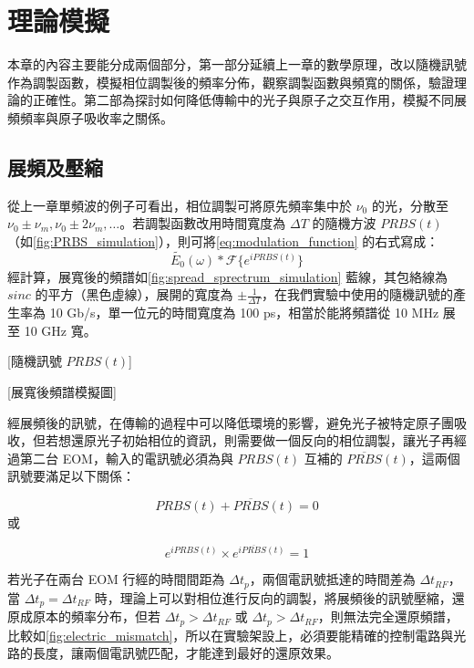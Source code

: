\documentclass[class=NCU_thesis, crop=false]{standalone}
\begin{document}
\chapter{理論模擬}
本章的內容主要能分成兩個部分，第一部分延續上一章的數學原理，改以隨機訊號作為調製函數，模擬相位調製後的頻率分佈，觀察調製函數與頻寬的關係，驗證理論的正確性。第二部為探討如何降低傳輸中的光子與原子之交互作用，模擬不同展頻頻率與原子吸收率之關係。

\section{展頻及壓縮}
從上一章單頻波的例子可看出，相位調製可將原先頻率集中於 $\nu_{0}$ 的光，分散至 $\nu_{0}\pm\nu_{m}, \nu_{0}\pm2\nu_{m},\dots$。若調製函數改用時間寬度為 $\Delta T$ 的隨機方波 $PRBS(t)$ （如\cref{fig:PRBS_simulation}），則可將\cref{eq:modulation_function} 的右式寫成：
\begin{equation}
    \tilde{E_{0}}(\omega)*\mathscr{F}\{{e^{i PRBS(t)}}\}
\end{equation}
經計算，展寬後的頻譜如\cref{fig:spread_sprectrum_simulation} 藍線，其包絡線為 $sinc$ 的平方（黑色虛線），展開的寬度為 $\pm\frac{1}{\Delta T}$，在我們實驗中使用的隨機訊號的產生率為 10 Gb/s，單一位元的時間寬度為 100 ps，相當於能將頻譜從 10 MHz 展至 10 GHz 寬。

[隨機訊號 $PRBS(t)$]

[展寬後頻譜模擬圖]

經展頻後的訊號，在傳輸的過程中可以降低環境的影響，避免光子被特定原子團吸收，但若想還原光子初始相位的資訊，則需要做一個反向的相位調製，讓光子再經過第二台 EOM，輸入的電訊號必須為與 $PRBS(t)$ 互補的 $\overline{PRBS}(t)$，這兩個訊號要滿足以下關係：

\begin{equation}
    \label{eq:prbs_condition}
    PRBS(t)+\overline{PRBS}(t)=0
\end{equation}
或

\begin{equation}
    e^{i PRBS(t)}\times e^{i \overline{PRBS}(t)}=1
\end{equation}

若光子在兩台 EOM 行經的時間間距為 $\Delta t_{p}$，兩個電訊號抵達的時間差為 $\Delta t_{RF}$，當 $\Delta t_{p}=\Delta t_{RF}$ 時，理論上可以對相位進行反向的調製，將展頻後的訊號壓縮，還原成原本的頻率分布，但若 $\Delta t_{p}>\Delta t_{RF}$ 或 $\Delta t_{p}>\Delta t_{RF}$，則無法完全還原頻譜，比較如\cref{fig:electric_mismatch}，所以在實驗架設上，必須要能精確的控制電路與光路的長度，讓兩個電訊號匹配，才能達到最好的還原效果。
\end{document}

